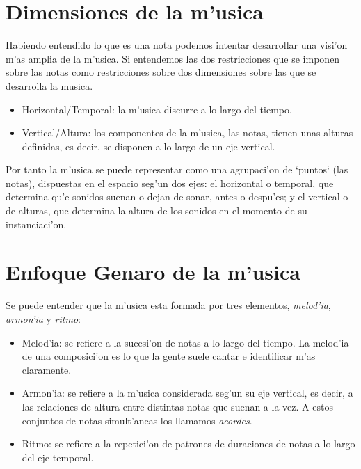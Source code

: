 \documentclass[a4paper,12pt]{article}
\begin{document}
\section{Dimensiones de la m'usica}
Habiendo entendido lo que es una nota podemos intentar desarrollar una visi'on m'as amplia de la m'usica. Si entendemos las dos restricciones que se imponen sobre las notas como restricciones sobre dos dimensiones sobre las que se desarrolla la musica.
\begin{itemize}
\item Horizontal/Temporal: la m'usica discurre a lo largo del tiempo.
\item Vertical/Altura: los componentes de la m'usica, las notas, tienen unas alturas definidas, es decir, se disponen a lo largo de un eje vertical.
\end{itemize}

Por tanto la m'usica se puede representar como una agrupaci'on de `puntos` (las notas), dispuestas en el espacio seg'un dos ejes: el horizontal o temporal, que determina qu'e sonidos suenan o dejan de sonar, antes o despu'es; y el vertical o de alturas, que determina la altura de los sonidos en el momento de su instanciaci'on.

\section{Enfoque Genaro de la m'usica}
Se puede entender que la m'usica esta formada por tres elementos, \emph{melod'ia}, \emph{armon'ia} y \emph{ritmo}:
\begin{itemize}
\item Melod'ia: se refiere a la sucesi'on de notas a lo largo del tiempo. La melod'ia de una composici'on es lo que la gente suele cantar e identificar m'as claramente.
\item Armon'ia: se refiere a la m'usica considerada seg'un su eje vertical, es decir, a las relaciones de altura entre distintas notas que suenan a la vez. A estos conjuntos de notas simult'aneas los llamamos \emph{acordes}.
\item Ritmo: se refiere a la repetici'on de patrones de duraciones de notas a lo largo del eje temporal.
\end{itemize}
\end{document}
